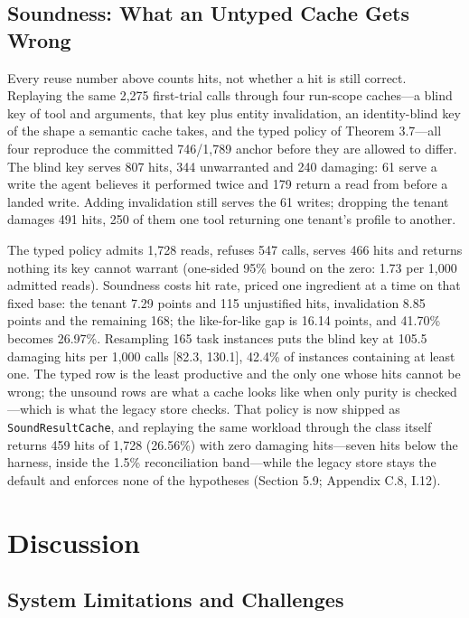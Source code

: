 \documentclass[
  sigconf,
  anonymous]{acmart}
\newcounter{none} %
\begin{document}
\subsection{Soundness: What an Untyped Cache Gets
Wrong}\label{soundness-what-an-untyped-cache-gets-wrong}

Every reuse number above counts hits, not whether a hit is still
correct. Replaying the same 2,275 first-trial calls through four
run-scope caches---a blind key of tool and arguments, that key plus
entity invalidation, an identity-blind key of the shape a semantic cache
takes, and the typed policy of Theorem 3.7---all four reproduce the
committed 746/1,789 anchor before they are allowed to differ. The blind
key serves 807 hits, 344 unwarranted and 240 damaging: 61 serve a write
the agent believes it performed twice and 179 return a read from before
a landed write. Adding invalidation still serves the 61 writes; dropping
the tenant damages 491 hits, 250 of them one tool returning one tenant's
profile to another.

The typed policy admits 1,728 reads, refuses 547 calls, serves 466 hits
and returns nothing its key cannot warrant (one-sided 95\% bound on the
zero: 1.73 per 1,000 admitted reads). Soundness costs hit rate, priced
one ingredient at a time on that fixed base: the tenant 7.29 points and
115 unjustified hits, invalidation 8.85 points and the remaining 168;
the like-for-like gap is 16.14 points, and 41.70\% becomes 26.97\%.
Resampling 165 task instances puts the blind key at 105.5 damaging hits
per 1,000 calls {[}82.3, 130.1{]}, 42.4\% of instances containing at
least one. The typed row is the least productive and the only one whose
hits cannot be wrong; the unsound rows are what a cache looks like when
only purity is checked---which is what the legacy store checks. That
policy is now shipped as \texttt{SoundResultCache}, and replaying the
same workload through the class itself returns 459 hits of 1,728
(26.56\%) with zero damaging hits---seven hits below the harness, inside
the 1.5\% reconciliation band---while the legacy store stays the default
and enforces none of the hypotheses (Section 5.9; Appendix C.8, I.12).

\section{Discussion}\label{discussion}

\subsection{System Limitations and
Challenges}\label{system-limitations-and-challenges}
\end{document}

